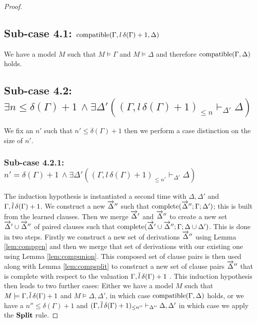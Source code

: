 \begin{mytheorem}
\begin{proof}
\subsection*{Sub-case 4.1: $\mathrm{compatible}(\Gamma, l \, \delta(\Gamma) + 1,\Delta)$}
We have a model $M$ such that $M \models \Gamma$ and $M \models \Delta$ and therefore $\mathrm{compatible}(\Gamma,\Delta)$ holds.
%
\subsection*{Sub-case 4.2: $ \exists n \leq \delta(\Gamma) + 1 \, \wedge  \exists \Delta' ( (\Gamma, l \, \delta(\Gamma) + 1)_{ \leq n}  \vdash_{\Delta'} \Delta)$}
We fix an $n'$ such that $n' \leq \delta(\Gamma) + 1$ then we perform a case distinction on the size of $n'$.
%
\subsubsection*{Sub-case 4.2.1: $  n' = \delta(\Gamma) + 1 \, \wedge  \exists \Delta' ( (\Gamma, l \, \delta(\Gamma) + 1) _{\leq n'}  \vdash_{\Delta'} \Delta)$}
The induction hypothesis is instantiated a second time with $\Delta, \Delta'$ and $\Gamma, \overline{l} \, \delta(\Gamma) + 1$. We construct a new $\overrightarrow{\Delta}''$ such that $\mathrm{complete}(\overrightarrow{\Delta}'';\Gamma; \Delta')$; this is built from the learned clauses. Then we merge $\overrightarrow{\Delta}'$ and $\overrightarrow{\Delta}''$ to create a new set $\overrightarrow{\Delta}' \cup \overrightarrow{\Delta}''$ of paired clauses such that $\mathrm{complete}(\overrightarrow{\Delta}' \cup \overrightarrow{\Delta}'';\Gamma; \Delta \cup \Delta')$. This is done in two steps. Firstly we construct a new set of derivations $\overrightarrow{\Delta}''$ using Lemma \ref{lem:compgen} and then we merge that set of derivations with our existing one using Lemma \ref{lem:compunion}. This composed set of clause pairs is then used  along with Lemma \ref{lem:compsplit} to construct a new set of clause pairs $\overrightarrow{\Delta}''$ that is complete with respect to the valuation $\Gamma, \overline{l} \, \delta(\Gamma) + 1$ .  This induction hypothesis then leads to two further cases: Either we have a model $M$ such that $M \models \Gamma, \overline{l} \, \delta(\Gamma) + 1$ and $M \models \Delta, \Delta'$, in which case $\mathrm{compatible}(\Gamma,\Delta)$ holds, or we have a $n'' \leq \delta(\Gamma) + 1$ and $(\Gamma, \overline{l} \, \delta(\Gamma) + 1)_{\leq n''} \vdash_{\Delta''} \Delta, \Delta'$ in which case we apply the $\mathbf{Split}$ rule.
\begin{comment}
\textbf{We need to know that all of the learned clauses in $\Delta'$ are derivable from $\Gamma$ and $\Delta$ otherwise they are useless as the $\Conflict$ could not be applied to them. We know that they can be derived from some $\Gamma$ and $\Delta$ but how do we know that they are derivable from the current $\Gamma$ since it could be the case that backtracking has occured and there is now a smaller $\Gamma$.}
\end{comment}
%

\end{proof}
\end{mytheorem}
